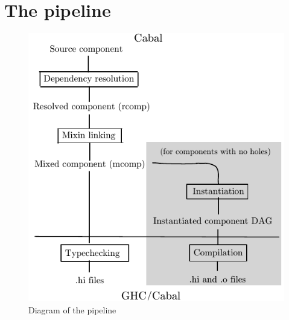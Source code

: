\chapter{The pipeline}
\label{sec:overview}

\begin{figure}
\center\includegraphics{diagrams/pipeline.pdf}
\caption{Diagram of the pipeline}\label{fig:pipeline}
\end{figure}

